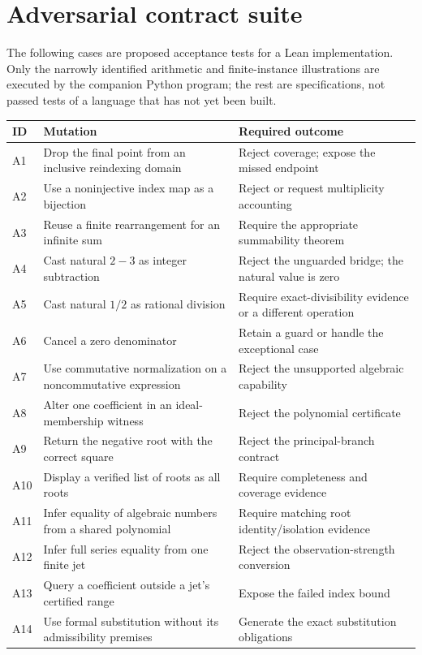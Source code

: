 \documentclass[11pt,a4paper]{article}
\theoremstyle{definition}
\begin{document}
\section{Adversarial contract suite}
\label{app:tests}
The following cases are proposed acceptance tests for a Lean implementation.
Only the narrowly identified arithmetic and finite-instance illustrations are
executed by the companion Python program; the rest are specifications, not
passed tests of a language that has not yet been built.
\begin{longtable}{@{}P{.07\textwidth}P{.43\textwidth}P{.42\textwidth}@{}}
\toprule
ID & Mutation & Required outcome \\
\midrule
\endhead
A1 & Drop the final point from an inclusive reindexing domain & Reject coverage; expose the missed endpoint \\
A2 & Use a noninjective index map as a bijection & Reject or request multiplicity accounting \\
A3 & Reuse a finite rearrangement for an infinite sum & Require the appropriate summability theorem \\
A4 & Cast natural $2-3$ as integer subtraction & Reject the unguarded bridge; the natural value is zero \\
A5 & Cast natural $1/2$ as rational division & Require exact-divisibility evidence or a different operation \\
A6 & Cancel a zero denominator & Retain a guard or handle the exceptional case \\
A7 & Use commutative normalization on a noncommutative expression & Reject the unsupported algebraic capability \\
A8 & Alter one coefficient in an ideal-membership witness & Reject the polynomial certificate \\
A9 & Return the negative root with the correct square & Reject the principal-branch contract \\
A10 & Display a verified list of roots as all roots & Require completeness and coverage evidence \\
A11 & Infer equality of algebraic numbers from a shared polynomial & Require matching root identity/isolation evidence \\
A12 & Infer full series equality from one finite jet & Reject the observation-strength conversion \\
A13 & Query a coefficient outside a jet's certified range & Expose the failed index bound \\
A14 & Use formal substitution without its admissibility premises & Generate the exact substitution obligations \\

\end{longtable}
\end{document}
